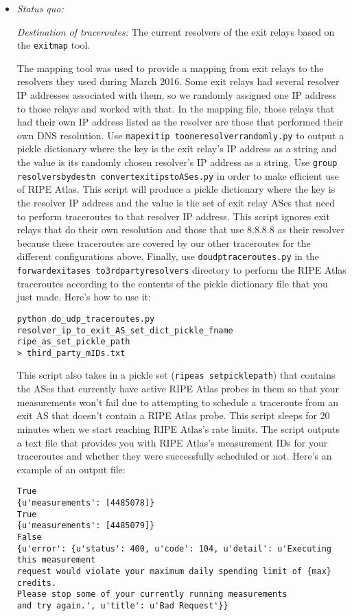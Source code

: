 \documentclass{article}
\begin{document}
\begin{itemize}
\item \emph{Status quo:}

\emph{Destination of traceroutes:} The current resolvers of the exit relays based on 
the {\tt exitmap} tool. 

The mapping tool was used to provide a mapping from exit relays to the resolvers they used 
during March 2016. Some exit relays had several resolver IP addresses associated with them, 
so we randomly assigned one IP address to those relays and worked with that. In the 
mapping file, those relays that had their own IP address listed as the resolver are those 
that performed their own DNS resolution. Use 
{\tt map\textunderscore exit\textunderscore ip\textunderscore 
to\textunderscore one\textunderscore resolver\textunderscore randomly.py} to output a 
pickle dictionary where the key is the exit relay's IP address as a string and the 
value is its randomly chosen resolver's IP address as a string. Use {\tt group\textunderscore 
resolvers\textunderscore by\textunderscore dest\textunderscore n\textunderscore 
convert\textunderscore exit\textunderscore ips\textunderscore to\textunderscore ASes.py} 
in order to make efficient use of RIPE Atlas. This script will produce a pickle 
dictionary where the key is the resolver IP address and the value is the set of 
exit relay ASes that need to perform traceroutes to that resolver IP address. This 
script ignores exit relays that do their own resolution and those that use 
8.8.8.8 as their resolver because these traceroutes are covered by our other 
traceroutes for the different configurations above. Finally, use 
{\tt do\textunderscore udp\textunderscore traceroutes.py} in the 
{\tt forward\textunderscore exit\textunderscore ases\textunderscore 
to\textunderscore 3rd\textunderscore party\textunderscore resolvers} 
directory to perform the RIPE Atlas 
traceroutes according to the contents of the pickle dictionary file that you 
just made. 
Here's how to use it:
\begin{lstlisting}
python do_udp_traceroutes.py resolver_ip_to_exit_AS_set_dict_pickle_fname ripe_as_set_pickle_path
> third_party_mIDs.txt
\end{lstlisting}
This script also takes in a pickle set ({\tt ripe\textunderscore as\textunderscore 
set\textunderscore pickle\textunderscore path}) 
that contains the ASes that 
currently have active RIPE Atlas probes in them so that your measurements won't 
fail due to attempting to schedule a traceroute from an exit AS that doesn't contain 
a RIPE Atlas probe. This script sleeps for 20 minutes when we start reaching 
RIPE Atlas's rate limits. The script outputs a text file that provides you with 
RIPE Atlas's measurement IDs for your traceroutes and whether they were 
successfully scheduled or not. Here's an example of an output file:
\begin{lstlisting}
True
{u'measurements': [4485078]}
True
{u'measurements': [4485079]}
False
{u'error': {u'status': 400, u'code': 104, u'detail': u'Executing this measurement 
request would violate your maximum daily spending limit of {max} credits. 
Please stop some of your currently running measurements 
and try again.', u'title': u'Bad Request'}}
\end{lstlisting}


\end{itemize}
\end{document}
